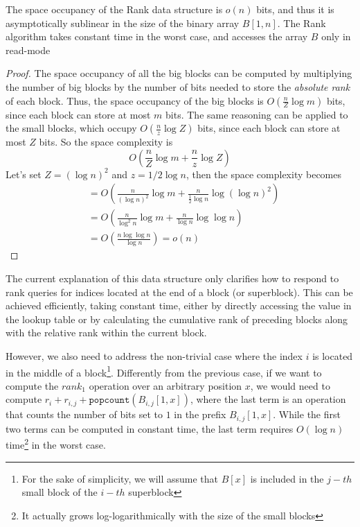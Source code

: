 \begin{theorem} \label{th:rank}
    The space occupancy of the Rank data structure is $o(n)$ bits, and thus it is asymptotically sublinear in the size of the binary array $B[1, n]$. The Rank algorithm takes constant time in the worst case, and accesses the array $B$ only in read-mode
\end{theorem}
\begin{proof}
    The space occupancy of all the big blocks can be computed by multiplying the number of big blocks by the number of bits needed to store the \emph{absolute rank} of each block. Thus, the space occupancy of the big blocks is $O(\frac{n}{Z} \log m)$ bits, since each block can store at most $m$ bits. The same reasoning can be applied to the small blocks, which occupy $O(\frac{n}{z} \log Z)$ bits, since each block can store at most $Z$ bits. So the space complexity is
    \begin{equation}
        O\left(\frac{n}{Z} \log m + \frac{n}{z} \log Z\right)
    \end{equation}
    Let's set $Z = (\log n)^2$ and $z = 1/2 \log n$, then the space complexity becomes
    \begin{align}
         & = O\left(\frac{n}{(\log n)^2} \log m + \frac{n}{\frac{1}{2} \log n} \log (\log n)^2\right) \\
         & = O\left(\frac{n}{\log^2n} \log m + \frac{n}{\log n} \log \log n\right)                    \\
         & = O\left(\frac{n \log \log n}{\log n} \right)= o(n)
    \end{align}
\end{proof}

\noindent The current explanation of this data structure only clarifies how to respond to rank queries for indices located at the end of a block (or superblock). This can be achieved efficiently, taking constant time, either by directly accessing the value in the lookup table or by calculating the cumulative rank of preceding blocks along with the relative rank within the current block.

\noindent However, we also need to address the non-trivial case where the index $i$ is located in the middle of a block\footnote{For the sake of simplicity, we will assume that $B[x]$ is included in the $j-th$ small block of the $i-th$ superblock}. Differently from the previous case, if we want to compute the $rank_1$ operation over an arbitrary position $x$, we would need to compute $r_i + r_{i,j} + \texttt{popcount}(B_{i,j}[1,x])$, where the last term is an operation that counts the number of bits set to $1$ in the prefix $B_{i,j}[1,x]$. While the first two terms can be computed in constant time, the last term requires $O(\log n)$ time\footnote{It actually grows log-logarithmically with the size of the small blocks} in the worst case.


